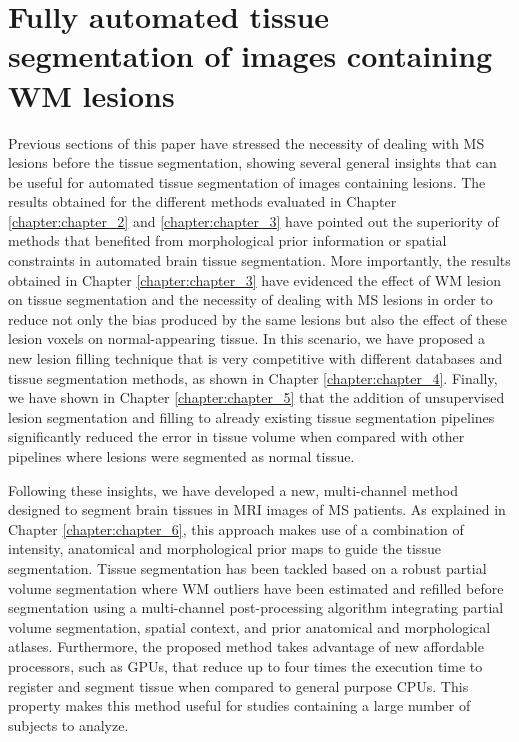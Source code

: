 \section{Fully automated tissue segmentation of images containing WM lesions}
\label{sec:label}

Previous sections of this paper have stressed the necessity of dealing with MS lesions before the tissue segmentation, showing several general insights that can be useful for automated tissue segmentation of images containing lesions. The results obtained for the different methods evaluated in Chapter \ref{chapter:chapter_2} and \ref{chapter:chapter_3} have pointed out the superiority of methods that benefited from morphological prior information or spatial constraints in automated brain tissue segmentation. More importantly, the results obtained in Chapter \ref{chapter:chapter_3} have evidenced the effect of WM lesion on tissue segmentation and the necessity of dealing with MS lesions in order to reduce not only the bias produced by the same lesions but also the effect of these lesion voxels on normal-appearing tissue. In this scenario, we have proposed a new lesion filling technique that is very competitive with different databases and tissue segmentation methods, as shown in Chapter \ref{chapter:chapter_4}. Finally, we have shown in Chapter \ref{chapter:chapter_5} that the addition of unsupervised lesion segmentation and filling to already existing tissue segmentation pipelines significantly reduced the error in tissue volume when compared with other pipelines where lesions were segmented as normal tissue. 

Following these insights, we have developed a new, multi-channel method designed to segment brain tissues in MRI images of MS patients. As explained in Chapter \ref{chapter:chapter_6}, this approach makes use of a combination of intensity, anatomical and morphological prior maps to guide the tissue segmentation. Tissue segmentation has been tackled based on a robust partial volume segmentation where WM outliers have been estimated and refilled before segmentation using a multi-channel post-processing algorithm integrating  partial volume segmentation, spatial context, and prior anatomical and morphological atlases. Furthermore, the proposed method takes advantage of new affordable processors, such as GPUs, that reduce up to four times the execution time to register and segment tissue when compared to general purpose CPUs. This property makes this method useful for studies containing a large number of subjects to analyze.   

